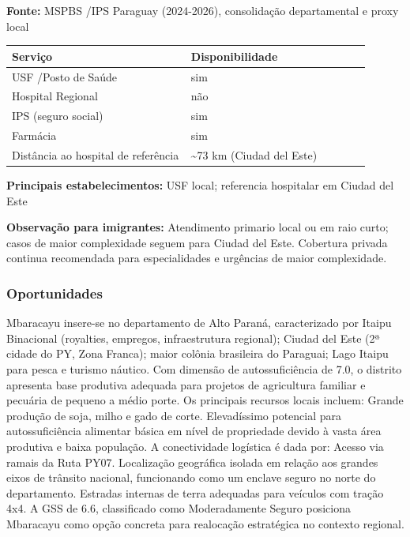 \textbf{Fonte:} MSPBS /\allowbreak  IPS Paraguay (2024-2026), consolidação
departamental e proxy local

{\def\LTcaptype{none} %
\begin{longtable}{@{}>{\raggedright\arraybackslash}p{0.45\linewidth} >{\raggedright\arraybackslash}p{0.45\linewidth}@{}}
\toprule\noalign{}
Serviço & Disponibilidade \\
\midrule\noalign{}
\endhead
\bottomrule\noalign{}
\endlastfoot
USF /\allowbreak  Posto de Saúde & sim \\
Hospital Regional & não \\
IPS (seguro social) & sim \\
Farmácia & sim \\
Distância ao hospital de referência & \textasciitilde73 km (Ciudad del
Este) \\
\end{longtable}
}

\textbf{Principais estabelecimentos:} USF local; referencia hospitalar
em Ciudad del Este

\textbf{Observação para imigrantes:} Atendimento primario local ou em
raio curto; casos de maior complexidade seguem para Ciudad del Este.
Cobertura privada continua recomendada para especialidades e urgências
de maior complexidade.
\newpage

\subsubsection*{Oportunidades}\label{oport-mbaracayu-1017}
Mbaracayu insere-se no departamento de Alto Paraná, caracterizado por Itaipu Binacional (royalties, empregos, infraestrutura regional); Ciudad del Este (2ª cidade do PY, Zona Franca); maior colônia brasileira do Paraguai; Lago Itaipu para pesca e turismo náutico. Com dimensão de autossuficiência de 7.0, o distrito apresenta base produtiva adequada para projetos de agricultura familiar e pecuária de pequeno a médio porte. Os principais recursos locais incluem: Grande produção de soja, milho e gado de corte. Elevadíssimo potencial para autossuficiência alimentar básica em nível de propriedade devido à vasta área produtiva e baixa população. A conectividade logística é dada por: Acesso via ramais da Ruta PY07. Localização geográfica isolada em relação aos grandes eixos de trânsito nacional, funcionando como um enclave seguro no norte do departamento. Estradas internas de terra adequadas para veículos com tração 4x4. A GSS de 6.6, classificado como Moderadamente Seguro posiciona Mbaracayu como opção concreta para realocação estratégica no contexto regional.

